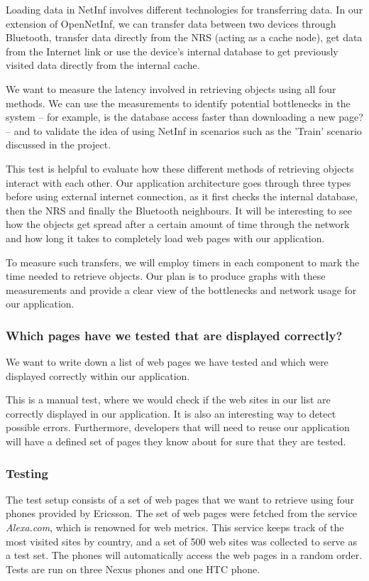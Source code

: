 Loading data in NetInf involves different technologies for transferring data. In our extension of OpenNetInf, we can transfer data between two devices through Bluetooth, transfer data directly from the NRS (acting as a cache node), get data from the Internet link or use the device's internal database to get previously visited data directly from the internal cache.

We want to measure the latency involved in retrieving objects using all four methods. We can use the measurements to identify potential bottlenecks in the system -- for example, is the database access faster than downloading a new page? -- and to validate the idea of using NetInf in scenarios such as the 'Train' scenario discussed in the project.

This test is helpful to evaluate how these different methods of retrieving objects interact with each other. Our application architecture goes through three types before using external internet connection, as it first checks the internal database, then the NRS and finally the Bluetooth neighbours. It will be interesting to see how the objects get spread after a certain amount of time through the network and how long it takes to completely load web pages with our application.

To measure such transfers, we will employ timers in each component to mark the time needed to retrieve objects. Our plan is to produce graphs with these measurements and provide a clear view of the bottlenecks and network usage for our application.

\subsubsection{Which pages have we tested that are displayed correctly?}
We want to write down a list of web pages we have tested and which were displayed correctly within our application.

This is a manual test, where we would check if the web sites in our list are correctly displayed in our application. It is also an interesting way to detect possible errors. Furthermore, developers that will need to reuse our application will have a defined set of pages they know about for sure that they are tested.

\subsubsection{Testing}
The test setup consists of a set of web pages that we want to retrieve using four phones provided by Ericsson. The set of web pages were fetched from the service \textit{Alexa.com}, which is renowned for web metrics. This service keeps track of the most visited sites by country, and a set of 500 web sites was collected to serve as a test set. The phones will automatically access the web pages in a random order. Tests are run on three Nexus phones and one HTC phone.

